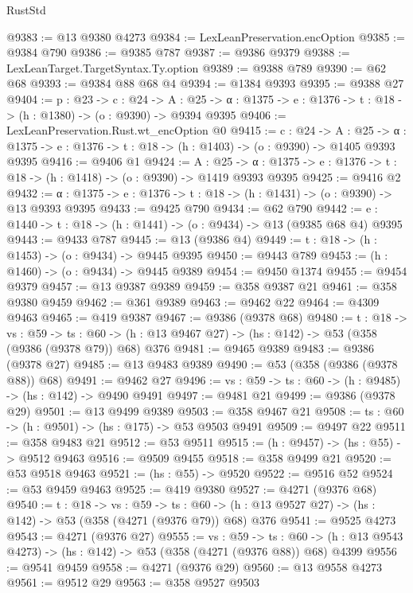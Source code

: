 \begin{lexlean}{RustStd}
\begin{coremodule}
@9383 := @13 @9380 @4273
@9384 := LexLeanPreservation.encOption
@9385 := @9384 @790
@9386 := @9385 @787
@9387 := @9386 @9379
@9388 := LexLeanTarget.TargetSyntax.Ty.option
@9389 := @9388 @789
@9390 := @62 @68
@9393 := @9384 @88 @68 @4
@9394 := @1384 @9393
@9395 := @9388 @27
@9404 := {p : @23} ->
  {c : @24} ->
  {A : @25} -> {α : @1375} -> {e : @1376} -> {t : @18} -> (h : @1380) -> (o : @9390) -> @9394 @9395
@9406 := LexLeanPreservation.Rust.wt_encOption @0
@9415 := {c : @24} ->
  {A : @25} ->
  {α : @1375} -> {e : @1376} -> {t : @18} -> (h : @1403) -> (o : @9390) -> @1405 @9393 @9395
@9416 := @9406 @1
@9424 := {A : @25} ->
  {α : @1375} -> {e : @1376} -> {t : @18} -> (h : @1418) -> (o : @9390) -> @1419 @9393 @9395
@9425 := @9416 @2
@9432 := {α : @1375} -> {e : @1376} -> {t : @18} -> (h : @1431) -> (o : @9390) -> @13 @9393 @9395
@9433 := @9425 @790
@9434 := @62 @790
@9442 := {e : @1440} -> {t : @18} -> (h : @1441) -> (o : @9434) -> @13 (@9385 @68 @4) @9395
@9443 := @9433 @787
@9445 := @13 (@9386 @4)
@9449 := {t : @18} -> (h : @1453) -> (o : @9434) -> @9445 @9395
@9450 := @9443 @789
@9453 := (h : @1460) -> (o : @9434) -> @9445 @9389
@9454 := @9450 @1374
@9455 := @9454 @9379
@9457 := @13 @9387 @9389
@9459 := @358 @9387 @21
@9461 := @358 @9380 @9459
@9462 := @361 @9389
@9463 := @9462 @22
@9464 := @4309 @9463
@9465 := @419 @9387
@9467 := @9386 (@9378 @68)
@9480 := {t : @18} ->
  {vs : @59} ->
  {ts : @60} -> (h : @13 @9467 @27) -> (hs : @142) -> @53 (@358 (@9386 (@9378 @79)) @68) @376
@9481 := @9465 @9389
@9483 := @9386 (@9378 @27)
@9485 := @13 @9483 @9389
@9490 := @53 (@358 (@9386 (@9378 @88)) @68)
@9491 := @9462 @27
@9496 := {vs : @59} -> {ts : @60} -> (h : @9485) -> (hs : @142) -> @9490 @9491
@9497 := @9481 @21
@9499 := @9386 (@9378 @29)
@9501 := @13 @9499 @9389
@9503 := @358 @9467 @21
@9508 := {ts : @60} -> (h : @9501) -> (hs : @175) -> @53 @9503 @9491
@9509 := @9497 @22
@9511 := @358 @9483 @21
@9512 := @53 @9511
@9515 := (h : @9457) -> (hs : @55) -> @9512 @9463
@9516 := @9509 @9455
@9518 := @358 @9499 @21
@9520 := @53 @9518 @9463
@9521 := (hs : @55) -> @9520
@9522 := @9516 @52
@9524 := @53 @9459 @9463
@9525 := @419 @9380
@9527 := @4271 (@9376 @68)
@9540 := {t : @18} ->
  {vs : @59} ->
  {ts : @60} -> (h : @13 @9527 @27) -> (hs : @142) -> @53 (@358 (@4271 (@9376 @79)) @68) @376
@9541 := @9525 @4273
@9543 := @4271 (@9376 @27)
@9555 := {vs : @59} ->
  {ts : @60} -> (h : @13 @9543 @4273) -> (hs : @142) -> @53 (@358 (@4271 (@9376 @88)) @68) @4399
@9556 := @9541 @9459
@9558 := @4271 (@9376 @29)
@9560 := @13 @9558 @4273
@9561 := @9512 @29
@9563 := @358 @9527 @9503

\end{coremodule}
\end{lexlean}
